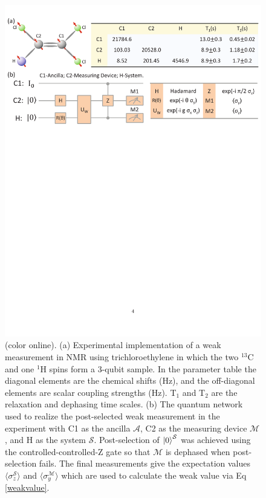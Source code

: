 \documentclass[aps,pra,12pt,onecolumn,showpacs,superscriptaddress,floatfix,footinbib,subfigure]{revtex4}
\def\ket#1{\mathinner{|{#1}\rangle}}
\def\es{{\mathcal{S}}}
\def\md{{\mathcal{M}}}
\def\ea{{\mathcal{A}}}
\begin{document}
\begin{figure}[h] \centering
\includegraphics[width=\columnwidth]{molecule.pdf}
\caption{(color online). (a) Experimental implementation of a weak measurement in NMR using trichloroethylene in which the two $^{13}$C and one $^{1}$H spins form a 3-qubit sample. In the parameter table  the diagonal elements are the chemical shifts (Hz), and the off-diagonal elements are scalar coupling strengths (Hz).  T$_1$ and T$_2$ are the relaxation and dephasing time scales.  (b) The quantum network used to realize the post-selected weak measurement in the experiment with  C1 as the ancilla $\ea$, C2 as the measuring device $\md$, and H as the system $\es$.  Post-selection of $\ket{0}^\es$ was  achieved using the controlled-controlled-Z gate so that $\md$ is dephased when post-selection fails.  The final measurements give the expectation values $\langle\sigma_z^\es\rangle$ and $\langle\sigma_y^\md\rangle$ which are used to calculate the weak value via  Eq \eqref{weakvalue}.  }\label{molecule}
\end{figure}
\end{document}
